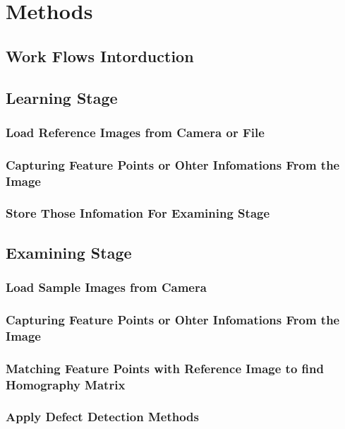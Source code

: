 \chapter{Methods}
\label{c:methods}

\section{Work Flows Intorduction}

\section{Learning Stage}
\subsection{Load Reference Images from Camera or File}
\subsection{Capturing Feature Points or Ohter Infomations From the Image}
\subsection{Store Those Infomation For Examining Stage}

\section{Examining Stage}
\subsection{Load Sample Images from Camera}
\subsection{Capturing Feature Points or Ohter Infomations From the Image}
\subsection{Matching Feature Points with Reference Image to find Homography Matrix}
\subsection{Apply Defect Detection Methods}
